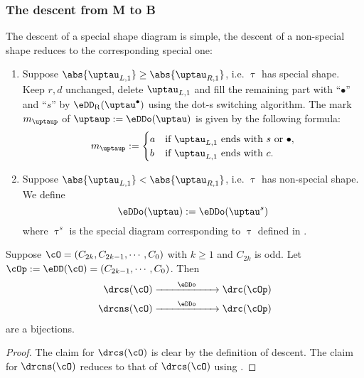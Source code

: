 \documentclass[ssunip]{subfiles}
\begin{document}
\subsubsection{The descent from M to B}
The descent of a special shape diagram is simple, the descent of a non-special shape
reduces to the corresponding special one:
\begin{enumerate}[resume*=alg2]
  \item Suppose $\abs{\taulf} \geq \abs{\taurf} $, i.e. $\uptau$ has special
        shape. Keep $r,d$ unchanged, delete $\taulf$ and fill the remaining part
        with ``$\bullet$'' and ``$s$'' by $\DDr(\uptau^{\bullet})$ using the
        dot-s switching algorithm. The mark $m_{\uptaup}$ of
        $\uptaup:=\eDDo(\uptau)$ is given by the following formula:
        \[
        m_{\uptaup}:= \begin{cases}
          a & \text{if  $\taulf$ ends with $s$ or $\bullet$},\\
          b & \text{if $\taulf$ ends with $c$}.
        \end{cases}
        \]

  \item Suppose $\abs{\taulf} < \abs{\taurf}$, i.e. $\uptau$ has non-special
        shape. We define
        \[\eDDo(\uptau):=\eDDo(\uptau^{s})\]
        where $\uptau^{s}$ is the special diagram corresponding to $\uptau$
        defined in .
\end{enumerate}

\begin{lem}\label{lem:ds.BM}
  Suppose $\cO = (C_{2k},C_{2k-1}, \cdots, C_{0})$ with $k\geq 1$ and $C_{2k}$
  is odd.
  Let $\cOp := \eDD(\cO)=(C_{2k-1},\cdots, C_{0})$.
  Then
  \[
    \begin{split}
      \drcs(\cO) &\xrightarrow{\hspace{2em}\eDDo\hspace{2em}} \drc(\cOp) \\
      \drcns(\cO)&
      \xrightarrow{\hspace{2em}\eDDo\hspace{2em}} \drc(\cOp)
    \end{split}
  \]
  are a bijections.
\end{lem}
\begin{proof}
  The claim for $\drcs(\cO)$ is clear by the definition of descent.
  The claim for $\drcns(\cO)$ reduces to that of $\drcs(\cO)$ using .
\end{proof}
\end{document}
